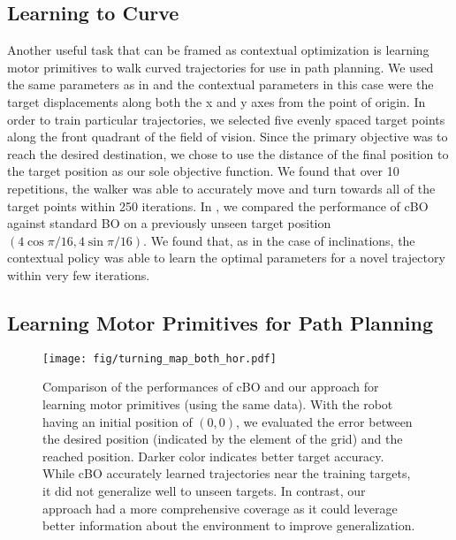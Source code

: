 	
\subsection{Learning to Curve}
\label{sec:results:context2}
	
	Another useful task that can be framed as contextual optimization is learning motor primitives to walk curved trajectories for use in path planning.
	We used the same parameters as in  and the contextual parameters in this case were the target displacements along both the x and y axes from the point of origin.
	In order to train particular trajectories, we selected five evenly spaced target points along the front quadrant of the field of vision.
	Since the primary objective was to reach the desired destination, we chose to use the distance of the final position to the target position as our sole objective function.
	We found that over 10 repetitions, the walker was able to accurately move and turn towards all of the target points within 250 iterations.
	In , we compared the performance of cBO against standard BO on a previously unseen target position $(4\cos{\pi / 16}, 4\sin{\pi / 16})$.
	We found that, as in the case of inclinations, the contextual policy was able to learn the optimal parameters for a novel trajectory within very few iterations.


\subsection{Learning Motor Primitives for Path Planning}
\label{sec:results:planning}
	\begin{figure}[t]
	  \centering
	  \texttt{[image: fig/turning\_map\_both\_hor.pdf]}
	  \caption{Comparison of the performances of cBO and our approach for learning motor primitives (using the same data). 
	  With the robot having an initial position of $(0,0)$, we evaluated the error between the desired position (indicated by the element of the grid) and the reached position.
	  Darker color indicates better target accuracy.
	  While cBO accurately learned trajectories near the training targets, it did not generalize well to unseen targets. 
	  In contrast, our approach had a more comprehensive coverage as it could leverage better information about the environment to improve generalization.}
	  \label{fig:pathing1}
	\end{figure}

